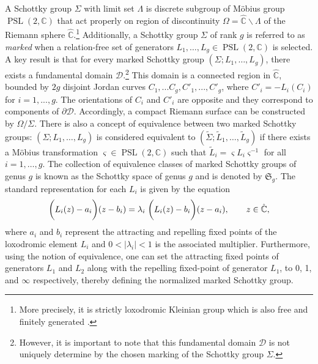 \documentclass[a4paper,11pt]{article}
\newcommand{\cmpx}{\mathbb{C}}
\newcommand{\schottky}{\mathfrak{S}}
\newcommand{\PSLC}{\operatorname{PSL}(2,\mathbb{C})}
\newcommand{\SchottkyFund}{\mathcal{D}}
\begin{document}
A Schottky group $\Sigma$ with limit set  $\Lambda$ is discrete subgroup of M\"{o}bius group $\PSLC$ that act properly on region of discontinuity $\Omega = \hat{\cmpx}\backslash\Lambda$ of the Riemann sphere $\hat{\cmpx}$.\footnote{More precisely, it is strictly loxodromic Kleinian group which is also free and finitely generated \cite{Maskit_1967}.} Additionally, a Schottky group $\Sigma$ of rank $g$  is referred to as \emph{marked} when a relation-free set of generators $L_1, \dots, L_g  \in \PSLC$ is selected. A key result is that for every marked Schottky group $(\Sigma;L_1,\dots,L_g)$, there exists a fundamental domain 
$\SchottkyFund$.\footnote{However, it is important to note that this fundamental domain $\SchottkyFund$ is not uniquely determine by the chosen marking of the Schottky group $\Sigma$.} This domain is a connected region in $\hat{\cmpx}$, bounded by $2g$ disjoint Jordan curves $C_1,...C_g,C'_{1},...,C'_g$, where 
$C'_i= -L_i(C_i)$ for $i=1,...,g$. The orientations of $C_i$
and $C'_i$ are opposite and they correspond to components of $\partial\SchottkyFund$. Accordingly, a compact Riemann surface can be constructed by $\Omega\slash\Sigma$. There is also a concept of equivalence between two marked Schottky groups: 
$(\Sigma; L_1, \dots, L_g)$ is considered equivalent to 
$(\tilde{\Sigma}; \tilde{L}_1, \dots, \tilde{L}_g)$ if there exists a Möbius transformation 
$\varsigma \in \PSLC$ such that 
$\tilde{L}_i = \varsigma  L_i \varsigma^{-1}$ for all $i=1,\dots,g$.  The collection of equivalence classes of marked Schottky groups of genus $g$ is known as the Schottky space of genus $g$ and is denoted by $\schottky_{g}$. The standard representation for each $L_i$ is given by the equation
\begin{equation}
\bigg(L_i (z) - a_i\bigg)(z-b_i) = \lambda_i\hspace{1mm}\bigg(L_i (z) - b_i\bigg)(z-a_i), \qquad z \in \hat{\cmpx},
\end{equation}
where $a_i$ and $b_i$ represent the attracting and repelling fixed points of the loxodromic element $L_i$ and $0 < |\lambda_i| < 1$ is the associated multiplier. Furthermore, using the notion of equivalence, one can set the attracting fixed points of generators $L_1$ and $L_2$ along with the repelling fixed-point of generator $L_1$,  to 0, 1, and $\infty$ respectively, thereby defining the normalized marked Schottky group.
\end{document}

